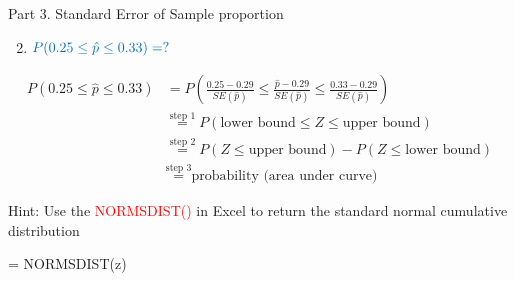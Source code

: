 \documentclass[
  10pt,
  ignorenonframetext,
]{beamer}
\newenvironment{Shaded}{\begin{snugshade}}{\end{snugshade}}
\newcommand{\NormalTok}[1]{#1}
\providecommand{\tightlist}{%
  \setlength{\itemsep}{0pt}\setlength{\parskip}{0pt}}
\begin{document}
\begin{frame}[fragile]{Part 3. Standard Error of Sample proportion}
\protect\hypertarget{part-3.-standard-error-of-sample-proportion-3}{}
\begin{enumerate}
\setcounter{enumi}{1}
\tightlist
\item
  \(\color{blue}{P(0.25 \leq \hat{p} \leq 0.33) = ?}\)
\end{enumerate}

\small

\[
\begin{aligned}
P(0.25 \leq \hat{p} \leq 0.33) &= P\left(\frac{0.25 - 0.29}{SE(\hat{p})} \leq \frac{\hat{p} - 0.29}{SE(\hat{p})} \leq \frac{0.33 - 0.29}{SE(\hat{p})}\right)\\
&\overset{\text{step 1}}{=} P\left(\text{lower bound} \leq Z \leq \text{upper bound}\right)\\
&\overset{\text{step 2}}{=} P\left(Z \leq \text{upper bound}\right) - P(Z \leq \text{lower bound})\\
&\overset{\text{step 3}}{=} \text{probability (area under curve)}
\end{aligned}
\]

Hint: Use the \textcolor{red}{NORMSDIST()} in Excel to return the
standard normal cumulative distribution

\begin{Shaded}
\begin{Highlighting}[]
\NormalTok{= NORMSDIST(z)}
\end{Highlighting}
\end{Shaded}
\end{frame}
\end{document}
